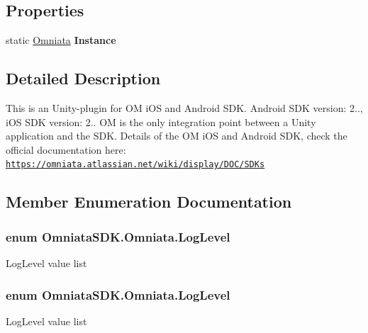 \subsection*{Properties}
\begin{DoxyCompactItemize}
\item 
\hypertarget{class_omniata_s_d_k_1_1_omniata_a00e806f197055cbbb16d804cc13233b3}{static \hyperlink{class_omniata_s_d_k_1_1_omniata}{Omniata} {\bfseries Instance}}\label{class_omniata_s_d_k_1_1_omniata_a00e806f197055cbbb16d804cc13233b3}

\end{DoxyCompactItemize}


\subsection{Detailed Description}
This is an Unity-\/plugin for O\+M i\+O\+S and Android S\+D\+K. Android S\+D\+K version\+: 2.., i\+O\+S S\+D\+K version\+: 2.. O\+M is the only integration point between a Unity application and the S\+D\+K. Details of the O\+M i\+O\+S and Android S\+D\+K, check the official documentation here\+: \href{https://omniata.atlassian.net/wiki/display/DOC/SDKs}{\tt https\+://omniata.\+atlassian.\+net/wiki/display/\+D\+O\+C/\+S\+D\+Ks} 



\subsection{Member Enumeration Documentation}
\hypertarget{class_omniata_s_d_k_1_1_omniata_aac4ddf8e7386e787ff7ff8bab48cc6de}{
\subsubsection[{Log\+Level}]{\setlength{\rightskip}{0pt plus 5cm}enum {\bf Omniata\+S\+D\+K.\+Omniata.\+Log\+Level}}}\label{class_omniata_s_d_k_1_1_omniata_aac4ddf8e7386e787ff7ff8bab48cc6de}
Log\+Level value list \hypertarget{class_omniata_s_d_k_1_1_omniata_aac4ddf8e7386e787ff7ff8bab48cc6de}{
\subsubsection[{Log\+Level}]{\setlength{\rightskip}{0pt plus 5cm}enum {\bf Omniata\+S\+D\+K.\+Omniata.\+Log\+Level}}}\label{class_omniata_s_d_k_1_1_omniata_aac4ddf8e7386e787ff7ff8bab48cc6de}
Log\+Level value list 

